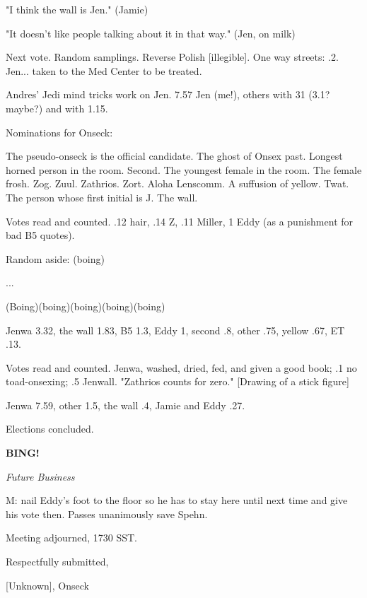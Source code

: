 \documentclass[12pt]{article}
\newcommand{\bing}{{\bf BING!} }
\newcommand{\goto}[1]{\bing \vskip 12pt \centerline{{\em{#1}}}}
\begin{document}
"I think the wall is Jen." (Jamie)

"It doesn't like people talking about it in that way." (Jen, on milk)

Next vote. Random samplings. Reverse Polish [illegible]. One way streets: .2. Jen... taken to the Med Center to be treated.

Andres' Jedi mind tricks work on Jen. 7.57 Jen (me!), others with 31 (3.1? maybe?) and with 1.15.

Nominations for Onseck:

The pseudo-onseck is the official candidate. The ghost of Onsex past. Longest horned person in the room. Second. The youngest female in the room. The female frosh. Zog. Zuul. Zathrios. Zort. Aloha Lenscomm. A suffusion of yellow. Twat. The person whose first initial is J. The wall.

Votes read and counted. .12 hair, .14 Z, .11 Miller, 1 Eddy (as a punishment for bad B5 quotes).

Random aside: (boing)

...

(Boing)(boing)(boing)(boing)(boing)

Jenwa 3.32, the wall 1.83, B5 1.3, Eddy 1, second .8, other .75, yellow .67, ET .13.

Votes read and counted. Jenwa, washed, dried, fed, and given a good book; .1 no toad-onsexing; .5 Jenwall. "Zathrios counts for zero." [Drawing of a stick figure]

Jenwa 7.59, other 1.5, the wall .4, Jamie and Eddy .27.

Elections concluded.

\goto{Future Business}

M: nail Eddy's foot to the floor so he has to stay here until next time and give his vote then. Passes unanimously save Spehn.

\vspace{12pt}

\noindent
Meeting adjourned, 1730 SST.

\vspace{18pt}

\centerline{Respectfully submitted,}
\centerline{[Unknown], Onseck}
\end{document}
